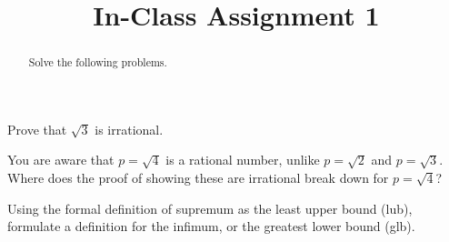 \documentclass{ximera}
\begin{document}
    \title{In-Class Assignment 1}
    \begin{abstract} Solve the following problems. \end{abstract}
    \maketitle

    \begin{exercise}
        Prove that $\sqrt{3}$ is irrational.
    \end{exercise}    

    \newpage
    \begin{exercise}
        You are aware that $p = \sqrt{4}$ is a rational number, unlike $p = \sqrt{2}$ and $p =\sqrt{3}$. Where does the proof of showing these are irrational break down for $p =\sqrt{4}$?
    \end{exercise}

    \vfill

    \begin{exercise}
        Using the formal definition of supremum as the least upper bound (lub), formulate a definition for the infimum, or the greatest lower bound (glb).
    \end{exercise}
    \vfill
\end{document}
